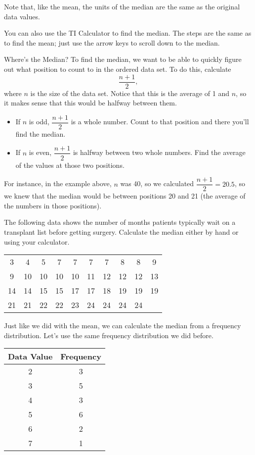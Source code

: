 Note that, like the mean, the units of the median are the same as the original data values.

You can also use the TI Calculator to find the median. The steps are the same as to find the mean; just use the arrow keys to scroll down to the median.
\vfill
\pagebreak

\begin{proc}{Where's the Median?}
To find the median, we want to be able to quickly figure out what position to count to in the ordered data set.  To do this, calculate \[\dfrac{n+1}{2},\] where $n$ is the size of the data set.  Notice that this is the average of 1 and $n$, so it makes sense that this would be halfway between them.
\begin{itemize}
\item If $n$ is odd, $\dfrac{n+1}{2}$ is a whole number.  Count to that position and there you'll find the median.
\item If $n$ is even, $\dfrac{n+1}{2}$ is halfway between two whole numbers.  Find the average of the values at those two positions.
\end{itemize}

For instance, in the example above, $n$ was 40, so we calculated $\dfrac{n+1}{2} = 20.5$, so we knew that the median would be between positions 20 and 21 (the average of the numbers in those positions).
\end{proc}

\begin{try}
The following data shows the number of months patients typically wait on a transplant list before getting surgery. Calculate the median either by hand or using your calculator.
\begin{center}
\begin{tabular}{c c c c c c c c c c}
3 & 4 & 5 & 7 & 7 & 7 & 7 & 8 & 8 & 9\\
9 & 10 & 10 & 10 & 10 & 11 & 12 & 12 & 12 & 13\\
14 & 14 & 15 & 15 & 17 & 17 & 18 & 19 & 19 & 19\\
21 & 21 & 22 & 22 & 23 & 24 & 24 & 24 & 24
\end{tabular}
\end{center}
\end{try}

Just like we did with the mean, we can calculate the median from a frequency distribution.  Let's use the same frequency distribution we did before.
\begin{center}
\begin{tabular}{c | c}
\textbf{Data Value} & \textbf{Frequency}\\
\hline
2 & 3\\
3 & 5\\
4 & 3\\
5 & 6\\
6 & 2\\
7 & 1
\end{tabular}
\end{center}


